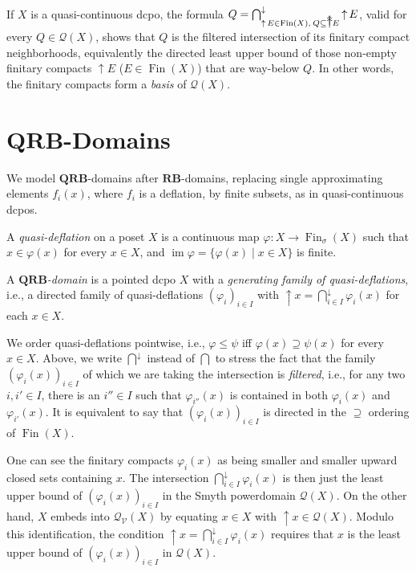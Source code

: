 \documentclass{LMCS}
\newcommand\Smyth{\mathcal Q}
\newcommand\V{{\mathcal V}}
\newcommand\SV{\Smyth_\V}
\newcommand\img{\mathop{\mathrm{im}}}
\newcommand\upc{\mathop{\uparrow}\nolimits}
\newcommand\uuarrow{\rlap{$\uparrow$}\raise.5ex\hbox{$\uparrow$}}\newcommand\ddarrow{\rlap{$\downarrow$}\raise.5ex\hbox{$\downarrow$}}\newcommand\Fin{\mathop{\text{Fin}}}
\newcommand\QRB{\mathbf{QRB}}
\newcommand\RB{\mathbf{RB}}
\begin{document}
If $X$ is a quasi-continuous dcpo, the formula $Q = \bigcap_{\upc E
  \in \Fin (X),\: Q \subseteq \uuarrow E}^\downarrow \upc E$, valid
for every $Q \in \Smyth (X)$, shows that $Q$ is the filtered
intersection of its finitary compact neighborhoods, equivalently the
directed least upper bound of those non-empty finitary compacts $\upc
E$ ($E \in \Fin (X)$) that are way-below $Q$.  In other words, the
finitary compacts form a {\em basis\/} of $\Smyth (X)$.



\section{$\QRB$-Domains}
\label{sec:qrb}

We model $\QRB$-domains after $\RB$-domains, replacing single
approximating elements $f_i (x)$, where $f_i$ is a deflation, by
finite subsets, as in quasi-continuous dcpos.

\begin{defi}[$\QRB$-Domain]
  \label{defn:qrb}
  A {\em quasi-deflation\/} on a poset $X$ is a continuous map
  $\varphi : X \to \Fin_\sigma (X)$ such that $x \in \varphi (x)$ for
  every $x \in X$, and $\img \varphi = \{\varphi (x) \mid x \in X\}$
  is finite.

  A {\em $\QRB$-domain\/} is a pointed dcpo $X$ with a {\em generating
    family of quasi-deflations\/}, i.e., a directed family of
  quasi-deflations ${(\varphi_i)}_{i \in I}$ with $\upc x = \bigcap_{i
    \in I}^\downarrow {\varphi_i (x)}$ for each $x\in X$.
\end{defi}
We order quasi-deflations pointwise, i.e., $\varphi \leq \psi$ iff
$\varphi (x) \supseteq \psi (x)$ for every $x \in X$.  Above, we write
$\bigcap^\downarrow$ instead of $\bigcap$ to stress the fact that the
family ${({\varphi_i (x)})}_{i \in I}$ of which we are taking the
intersection is {\em filtered\/}, i.e., for any two $i, i' \in I$,
there is an $i'' \in I$ such that ${\varphi_{i''} (x)}$ is contained
in both ${\varphi_{i} (x)}$ and ${\varphi_{i'} (x)}$.  It is
equivalent to say that ${(\varphi_i (x))}_{i \in I}$ is directed in
the $\supseteq$ ordering of $\Fin (X)$.

One can see the finitary compacts $\varphi_i (x)$ as being smaller and
smaller upward closed sets containing $x$.  The intersection
$\bigcap_{i \in I}^\downarrow {\varphi_i (x)}$ is then just the least
upper bound of ${({\varphi_i (x)})}_{i \in I}$ in the Smyth
powerdomain $\Smyth (X)$.  On the other hand, $X$ embeds into $\SV
(X)$ by equating $x \in X$ with $\upc x \in \Smyth (X)$.  Modulo this
identification, the condition $\upc x = \bigcap_{i \in I}^\downarrow
{\varphi_i (x)}$ requires that $x$ is the least upper bound of ${(
  {\varphi_i (x)})}_{i \in I}$ in $\Smyth (X)$.
\end{document}
